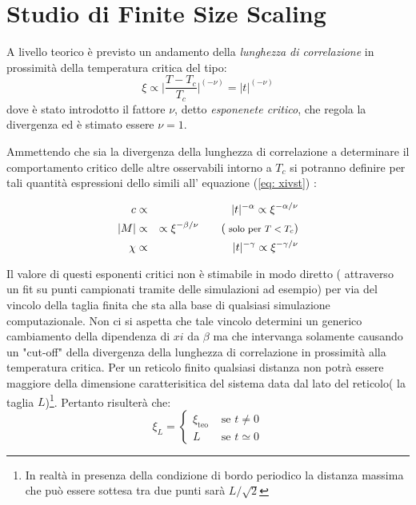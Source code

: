 \section{Studio di Finite Size Scaling}\label{Parte D}
A livello teorico è previsto un andamento della \emph{lunghezza di correlazione} in prossimità della temperatura critica del tipo:
\begin{equation}\label{eq: xivst}
\xi \propto \big| \dfrac{T - T_c}{T_c} \big|^{(-\nu)} = |t|^{(-\nu)}
\end{equation}
dove è stato introdotto il fattore $\nu$, detto \emph{esponenete critico}, che regola la divergenza ed è stimato essere  $\nu = 1$.

Ammettendo che sia la divergenza della lunghezza di correlazione a determinare il comportamento critico delle altre osservabili intorno a $T_c$ si potranno definire per tali quantità espressioni dello simili all' equazione (\ref{eq: xivst}) :

\begin{eqnarray}\label{eq: criticexpo}
 c & \propto & |t|^{-\alpha}  \propto \xi^{-\alpha / \nu}       \nonumber \\
 |M|  & \propto & \propto \xi^{-\beta / \nu}  \qquad (\textrm{\footnotesize{ solo per $T < T_c$}})\\
 \chi & \propto & |t|^{-\gamma}  \propto \xi^{-\gamma / \nu}
\end{eqnarray}

Il valore di questi esponenti critici non è stimabile in modo diretto ( attraverso un fit su punti campionati tramite delle simulazioni ad esempio) per via del vincolo della taglia finita che sta alla base di qualsiasi simulazione computazionale.
Non ci si aspetta che tale vincolo determini un generico cambiamento della dipendenza di $xi$ da $\beta$ ma che intervanga solamente causando un "cut-off" della divergenza della lunghezza di correlazione in prossimità alla temperatura critica.
Per un reticolo finito qualsiasi distanza non potrà essere maggiore della dimensione caratterisitica del sistema data dal lato del reticolo( la taglia $L$)\footnote{In realtà in presenza della condizione di bordo periodico la distanza massima che può essere sottesa tra due punti sarà $L/\sqrt{2}$}. Pertanto risulterà che:
\begin{equation}\label{eq: Xi_l}
\xi_L = \left\{ \begin{array}{rl}
 \xi_{\mbox{teo}}  &\mbox{ se $t \neq 0$} \\
  L &\mbox{ se $t \simeq 0$}
       \end{array} \right.
\end{equation}
\bigskip


